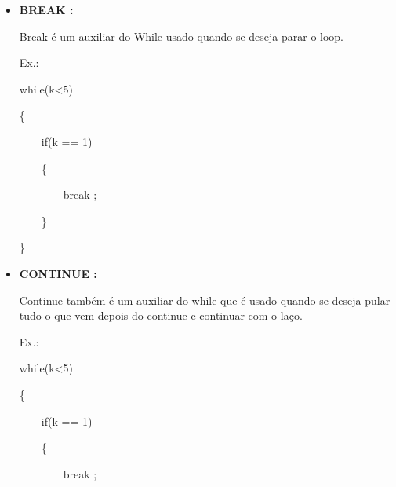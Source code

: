 \documentclass[a4paper]{article}
\begin{document}
{{{{{\begin{itemize}
            O while é utilzado normalmente, quando se
            deseja ter um laço, o usamos com a condição
            entre parêntesis.
        
            \textcolor{NavyBlue}{Ex.:}
            
            \textcolor{NavyBlue}{while(a<5)}
            
            \{
            
            \ \ \ \  say("Hello!!");
            \ \ \ \  a = a+1;
            
            \}
        
        \bigskip
            
        \item \textbf{BREAK :}
            
            Break é um auxiliar do While usado quando se 
            deseja parar o loop.
            
            \textcolor{NavyBlue}{Ex.:}
            
            while(k<5)
            
            \{
            
            \ \ \ \ if(k == 1)
              
            \ \ \ \ \{
              
            \ \ \ \ \ \ \ \ \textcolor{NavyBlue}{break}
                    ;
              
            \ \ \ \ \}
           
            \}
        
\newpage %
            
        \item \textbf{CONTINUE :}
            
            Continue também é um auxiliar do while que é
            usado quando se deseja pular tudo o que vem
            depois do continue e continuar com o laço.
            
            \textcolor{NavyBlue}{Ex.:}
            
            while(k<5)
            
            \{
            
            \ \ \ \ if(k == 1)
              
            \ \ \ \ \{
              
            \ \ \ \ \ \ \ \ \textcolor{NavyBlue}{break}
                    ;
              

\end{itemize}}}}}}
\end{document}
